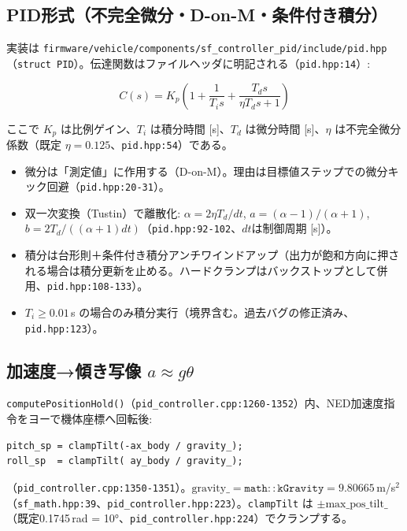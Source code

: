 \documentclass[a4paper,10pt]{ltjsarticle}
\begin{document}
\subsection{PID形式（不完全微分・D-on-M・条件付き積分）}

実装は \texttt{firmware/vehicle/components/sf\_controller\_pid/include/pid.hpp}（\texttt{struct PID}）。伝達関数はファイルヘッダに明記される（\texttt{pid.hpp:14}）:

\[
C(s) = K_p\left(1 + \frac{1}{T_i s} + \frac{T_d s}{\eta T_d s + 1}\right)
\]

ここで $K_p$ は比例ゲイン、$T_i$ は積分時間 [s]、$T_d$ は微分時間 [s]、$\eta$ は不完全微分係数（既定 $\eta = 0.125$、\texttt{pid.hpp:54}）である。

\begin{itemize}[leftmargin=*]
  \item 微分は「測定値」に作用する（D-on-M）。理由は目標値ステップでの微分キック回避（\texttt{pid.hpp:20-31}）。
  \item 双一次変換（Tustin）で離散化: $\alpha = 2\eta T_d/dt$, $a=(\alpha-1)/(\alpha+1)$, $b=2T_d/((\alpha+1)dt)$（\texttt{pid.hpp:92-102}、$dt$は制御周期 [s]）。
  \item 積分は台形則＋条件付き積分アンチワインドアップ（出力が飽和方向に押される場合は積分更新を止める。ハードクランプはバックストップとして併用、\texttt{pid.hpp:108-133}）。
  \item $T_i \geq 0.01$\,s の場合のみ積分実行（境界含む。過去バグの修正済み、\texttt{pid.hpp:123}）。
\end{itemize}

\subsection{加速度→傾き写像 $a \approx g\theta$}

\texttt{computePositionHold()}（\texttt{pid\_controller.cpp:1260-1352}）内、NED加速度指令をヨーで機体座標へ回転後:

\begin{verbatim}
pitch_sp = clampTilt(-ax_body / gravity_);
roll_sp  = clampTilt( ay_body / gravity_);
\end{verbatim}

（\texttt{pid\_controller.cpp:1350-1351}）。$\mathrm{gravity\_} = \mathtt{math::kGravity} = 9.80665$\,m/s$^2$（\texttt{sf\_math.hpp:39}、\texttt{pid\_controller.hpp:223}）。\texttt{clampTilt} は $\pm\mathrm{max\_pos\_tilt\_}$（既定0.1745\,rad = 10°、\texttt{pid\_controller.hpp:224}）でクランプする。
\end{document}
